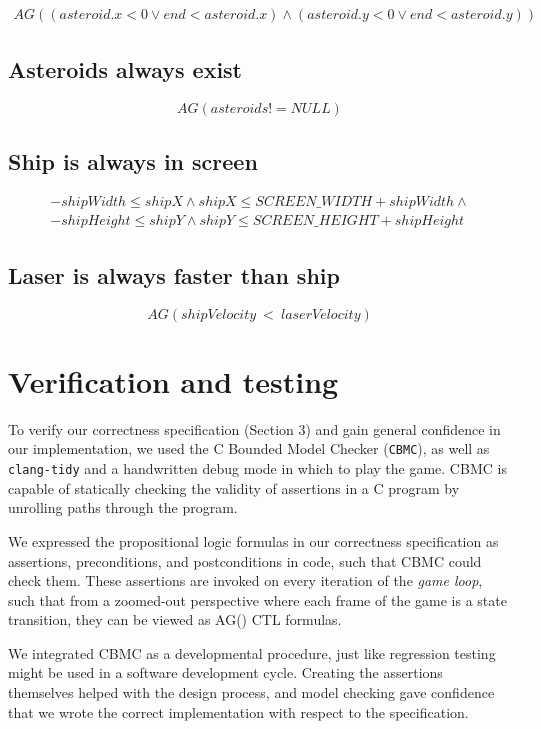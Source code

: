 \documentclass{article}
\newcommand{\cbmc}{\texttt{CBMC}}
\begin{document}
		\begin{align*}
			AG((asteroid.x < 0 \lor end < asteroid.x) \land
			(asteroid.y < 0 \lor end < asteroid.y))
		\end{align*}

    \subsection{Asteroids always exist}
    \[AG(asteroids != NULL)\]

    \subsection{Ship is always in screen}
    \begin{gather*}
        -shipWidth \leq shipX \land shipX \leq SCREEN\_WIDTH + shipWidth \land \\
        -shipHeight \leq shipY \land shipY \leq SCREEN\_HEIGHT + shipHeight
    \end{gather*}

    \subsection{Laser is always faster than ship}
    $$AG(shipVelocity~<~laserVelocity)$$

\section{Verification and testing}

    To verify our correctness specification (Section 3) and gain general
    confidence in our implementation, we used the C Bounded Model Checker
    (\cbmc{}), as well as \texttt{clang-tidy} and a handwritten debug mode in
    which to play the game. CBMC is capable of statically checking the
    validity of assertions in a C program by unrolling paths through the
    program.

    We expressed the propositional logic formulas in our correctness
    specification as assertions, preconditions, and postconditions in code, such
    that CBMC could check them. These assertions are invoked on every iteration
    of the \textit{game loop}, such that from a zoomed-out perspective where
    each frame of the game is a state transition, they can be viewed as AG()
    CTL formulas.

	We integrated CBMC as a developmental procedure, just like regression
    testing might be used in a software development cycle. Creating the
    assertions themselves helped with the design process, and model checking
    gave confidence that we wrote the correct implementation with respect to the
    specification.
\end{document}
